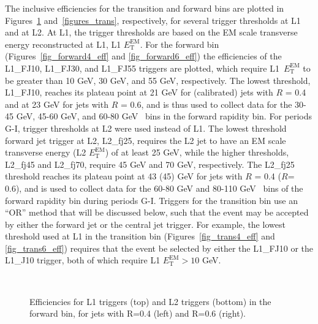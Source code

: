 The inclusive efficiencies for the transition and forward bins are plotted in Figures~\ref{figures_forward} and~\ref{figures_trans}, respectively, for several trigger thresholds at L1 and at L2. At L1, the trigger thresholds are based on the EM scale transverse energy reconstructed at L1, L1 $E_\mathrm{T}^\mathrm{EM}$. For the forward bin (Figures~\ref{fig_forward4_eff} and \ref{fig_forward6_eff}) the efficiencies of the L1\_FJ10, L1\_FJ30, and L1\_FJ55 triggers are plotted, which require L1~$E_\mathrm{T}^\mathrm{EM}$ to be greater than 10 GeV, 30 GeV, and 55 GeV, respectively. The lowest threshold, L1\_FJ10, reaches its plateau point at 21 GeV for (calibrated) jets with $R$ = 0.4 and at 23 GeV for jets with $R$ = 0.6, and is thus used to collect data for the 30-45 GeV, 45-60 GeV, and 60-80 GeV \pt~bins in the forward rapidity bin.  For periods G-I, trigger thresholds at L2 were used instead of L1. The lowest threshold forward jet trigger at L2, L2\_fj25, requires the L2 jet to have an EM scale transverse energy (L2 $E_\mathrm{T}^\mathrm{EM}$) of at least 25 GeV, while the higher thresholds, L2\_fj45 and L2\_fj70, require 45 GeV and 70 GeV, respectively. The L2\_fj25 threshold reaches its plateau point at 43 (45) GeV for jets with $R$ = 0.4 ($R$=  0.6), and is used to collect data for the 60-80 GeV and 80-110 GeV \pt~bins of the forward rapidity bin during periods G-I. Triggers for the transition bin use an ``OR'' method that will be discussed below, such that the event may be accepted by either the forward jet or the central jet trigger. For example, the lowest threshold used at L1 in the transition bin (Figures~\ref{fig_trans4_eff} and \ref{fig_trans6_eff}) requires that the event be selected by either the L1\_FJ10 or the L1\_J10 trigger, both of which require L1 $E_\mathrm{T}^\mathrm{EM} > 10$ GeV.

\begin{figure}[tbp]
\begin{centering}
\\
\caption[Trigger efficiencies in the forward bin]{Efficiencies for  L1 triggers (top) and L2 triggers (bottom) in the forward bin, for \akt jets with R=0.4 (left) and R=0.6 (right).} 
\label{figures_forward}
\end{centering}
\end{figure}

